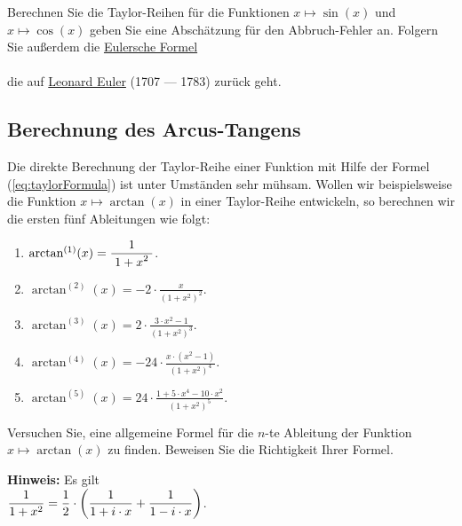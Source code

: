 \exercise
 Berechnen Sie die Taylor-Reihen f\"ur die Funktionen $x \mapsto \sin(x)$ und $x \mapsto \cos(x)$ geben Sie eine
Absch\"atzung f\"ur den Abbruch-Fehler an.  Folgern Sie au{\ss}erdem die
\href{http://de.wikipedia.org/wiki/Eulersche_Formel}{Eulersche Formel}
\\[0.2cm]
\hspace*{1.3cm}
\colorbox{red}{}
\\[0.2cm]
die auf 
\href{http://en.wikipedia.org/wiki/Leonard_Euler}{Leonard Euler} (1707 --- 1783) zur\"uck geht.
\eox


\subsection{Berechnung des Arcus-Tangens}
Die direkte Berechnung der Taylor-Reihe einer Funktion mit Hilfe der Formel
(\ref{eq:taylorFormula}) ist unter Umst\"anden sehr m\"uhsam.  Wollen wir beispielsweise die
Funktion $x \mapsto \arctan(x)$ in einer Taylor-Reihe entwickeln, so berechnen wir die
ersten f\"unf Ableitungen wie folgt:
\begin{enumerate}
\item $\arctan^{(1)}(x) = \displaystyle\frac{\;\displaystyle1\;}{\;\displaystyle1+{x}^{2}\;}$.
\item $\arctan^{(2)}(x) = \displaystyle -2 \cdot {\frac {x}{ \left( 1+{x}^{2} \right) ^{2}}}$.
\item $\arctan^{(3)}(x) = \displaystyle 2\cdot {\frac {3\cdot{x}^{2}-1}{ \left( 1+{x}^{2} \right)^{3}}}$.
\item $\arctan^{(4)}(x) = \displaystyle -24\cdot{\frac {x\cdot \left({x}^{2} - 1\right) }{ \left( 1+{x}^{2}
      \right)^{4}}}$.
\item $\arctan^{(5)}(x) = \displaystyle 24 \cdot{\frac {1+5\cdot{x}^{4}-10\cdot{x}^{2}}{ \left( 1+{x}^{2} \right)^{5}}}$.
\end{enumerate}

\exercise
Versuchen Sie, eine allgemeine Formel f\"ur die $n$-te Ableitung der Funktion \\
$x \mapsto \arctan(x)$ 
zu finden.  Beweisen Sie die Richtigkeit Ihrer Formel. 
\vspace*{0.2cm}

\noindent
\textbf{Hinweis:}  Es gilt
\\[0.2cm]
\hspace*{1.3cm}
$\displaystyle\frac{1}{1 + x^2} = \frac{1}{2} \cdot \left(\frac{1}{1 + i \cdot x} + \frac{1}{1 - i \cdot x}\right)$.
\eox
\vspace*{0.2cm}

